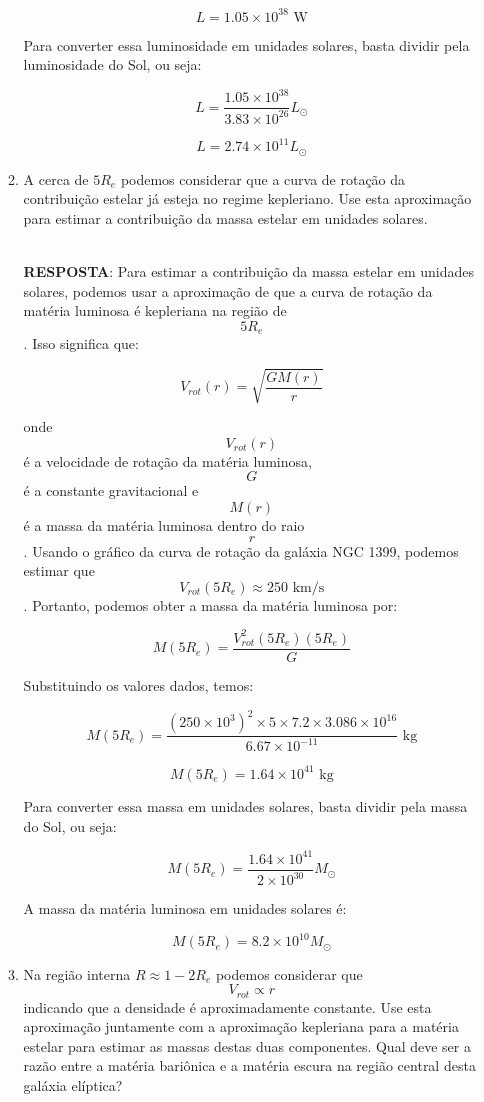 \documentclass[a4paper,12pt]{article}
\begin{document}
\begin{enumerate}
\begin{enumerate}
$$L = 1.05\times 10^{38} \text{ W}$$

Para converter essa luminosidade em unidades solares, basta dividir pela luminosidade do Sol, ou seja:

$$L = \frac{1.05\times 10^{38}}{3.83\times 10^{26}} L_{\odot}$$

$$L = 2.74\times 10^{11} L_{\odot}$$

\noindent\hrulefill

\item A cerca de $5 R_e$ podemos considerar que a curva de rotação da 
contribuição estelar já esteja no regime kepleriano. Use esta aproximação 
para estimar a contribuição da massa estelar em unidades solares.

\noindent\hrulefill\\\textbf{RESPOSTA}: Para estimar a contribuição da massa estelar em unidades solares, podemos usar a aproximação de que a curva de rotação da matéria luminosa é kepleriana na região de $$5 R_e$$. Isso significa que:

$$V_{rot}(r) = \sqrt{\frac{GM(r)}{r}}$$

onde $$V_{rot}(r)$$ é a velocidade de rotação da matéria luminosa, $$G$$ é a constante gravitacional e $$M(r)$$ é a massa da matéria luminosa dentro do raio $$r$$. Usando o gráfico da curva de rotação da galáxia NGC 1399, podemos estimar que $$V_{rot}(5 R_e) \approx 250 \text{ km/s}$$. Portanto, podemos obter a massa da matéria luminosa por:

$$M(5 R_e) = \frac{V_{rot}^2(5 R_e) (5 R_e)}{G}$$

Substituindo os valores dados, temos:

$$M(5 R_e) = \frac{(250\times 10^3)^2 \times 5 \times 7.2 \times 3.086\times 10^{16}}{6.67\times 10^{-11}} \text{ kg}$$

$$M(5 R_e) = 1.64\times 10^{41} \text{ kg}$$

Para converter essa massa em unidades solares, basta dividir pela massa do Sol, ou seja:

$$M(5 R_e) = \frac{1.64\times 10^{41}}{2\times 10^{30}} M_{\odot}$$

A massa da matéria luminosa em unidades solares é:

$$M(5 R_e) = 8.2\times 10^{10} M_{\odot}$$

\noindent\hrulefill

\item Na região interna $R \approx 1-2 R_e$ podemos considerar que $$V_{rot} \propto r$$ indicando que a densidade é aproximadamente 
constante. Use esta aproximação juntamente com a aproximação kepleriana 
para a matéria estelar para estimar as massas destas duas componentes. 
Qual deve ser a razão entre a matéria bariônica e a matéria escura na região 
central desta galáxia elíptica?


\end{enumerate}
\end{enumerate}
\end{document}
